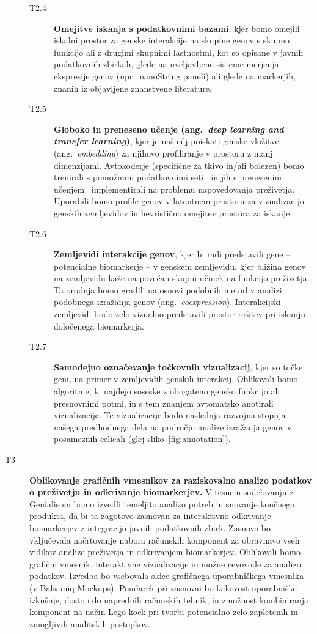 \documentclass[11pt,a4paper]{article}
\renewcommand{\bold}{\textbf}
\begin{document}
\begin{description}
\begin{description}
		\item[T2.4] \bold{Omejitve iskanja s podatkovnimi bazami}, kjer bomo omejili iskalni prostor za genske interakcije na skupine genov s skupno funkcijo ali z drugimi skupnimi lastnostmi, kot so opisane v javnih podatkovnih zbirkah, glede na uveljavljene sisteme merjenja ekspresije genov (npr.~nanoString paneli) ali glede na markerjih, znanih iz objavljene znanstvene literature.
 		\item[T2.5] \bold{Globoko in preneseno učenje (ang.~{\em deep learning and transfer learning})}, kjer je naš cilj poiskati genske vložitve (ang.~{\em embedding}) za njihovo profiliranje v prostoru z manj dimenzijami. Avtokoderje (specifične za tkivo in/ali bolezen) bomo trenirali s pomožnimi podatkovnimi seti~\cite{doersch2021tutorial} in jih s prenesenim učenjem~\cite{Godec2019} implementirali na problemu napovedovanja preživetja. Uporabili bomo profile genov v latentnem prostoru za vizualizacijo genskih zemljevidov in hevristično omejitev prostora za iskanje.
 		\item[T2.6] \bold{Zemljevidi interakcije genov}, kjer bi radi predstavili gene -- potencialne biomarkerje -- v genskem  zemljevidu, kjer bližina genov na zemljevidu kaže na povečan skupni učinek na funkcijo preživetja. Ta orodnja bomo gradili na osnovi podobnih metod v analizi podobnega izražanja genov (ang.~{\em coexpression}). Interakcijski zemljevidi bodo zelo vizualno predstavili prostor rešitev pri iskanju določenega biomarkerja.
		\item[T2.7] \bold{Samodejno označevanje točkovnih vizualizacij}, kjer so točke geni, na primer v zemljevidih genskih interakcij. Oblikovali bomo algoritme, ki najdejo soseske z obogateno gensko funkcijo ali presnovnimi potmi, in s tem znanjem avtomatsko anotirali vizualizacije. Te vizualizacije bodo naslednja razvojna stopnja našega predhodnega dela na področju analize izražanja genov v posameznih celicah (glej sliko~\ref{fig:annotation}).
	\end{description}
	\item[T3] \bold{Oblikovanje grafičnih vmesnikov za raziskovalno analizo podatkov o preživetju in odkrivanje biomarkerjev.} V tesnem sodelovanju z Genialisom bomo izvedli temeljito analizo potreb in snovanje končnega produkta, da bi ta zagotovo zasnovan za interaktivno odkrivanje biomarkerjev z integracijo javnih podatkovnih zbirk. Zasnova bo vključevala načrtovanje nabora računskih komponent za obravnavo vseh vidikov analize preživetja in odkrivanjem biomarkerjev. Oblikovali bomo grafični vmesnik, interaktivne vizualizacije in možne cevovode za analizo podatkov. Izvedba bo vsebovala skice grafičnega uporabniškega vmesnika (v Balsamiq Mockups). Poudarek pri zasnovai bo kakovost uporabniške izkušnje, dostop do naprednih računskih tehnik, in zmožnost kombiniranja komponent na način Lego kock pri tvorbi potencialno zelo zapletenih in zmogljivih analitskih postopkov.

\end{description}
\end{document}
